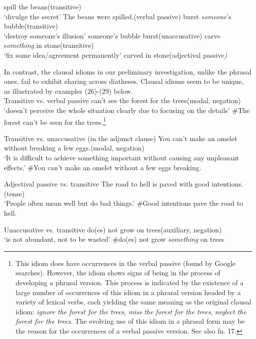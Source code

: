 \documentclass[output=paper,
modfonts
]{LSP/langsci}
\begin{document}
\ea
	\ea spill the beans\hfill (transitive)\\
	`divulge the secret'
	\ex The beans were spilled.\hfill (verbal passive)
	\z
\ex
	\ea burst \emph{someone}'s bubble\hfill (transitive)\\
	 `destroy someone's illusion'
	 \ex someone's bubble burst\hfill (unaccusative)
	 \z
\ex
	\ea carve s\emph{omething} in stone\hfill (transitive)\\
	 `fix some idea/agreement permanently'
	\ex carved in stone\hfill  (adjectival passive\emph{)}
	\z
\z

In contrast, the clausal idioms in our preliminary investigation, unlike
the phrasal ones, fail to exhibit sharing across diatheses. Clausal
idioms seem to be unique, as illustrated by examples (26)-(29) below.
\\

\noindent Transitive vs. verbal passive
\ea
	\ea can't see the forest for the trees\hfill (modal, negation)\\
	`doesn't perceive the whole situation clearly due to focusing on the
	details'
	\ex \#The forest can't be seen for the trees.\footnote{This idiom does
  	have occurrences in the verbal passive (found by Google searches).
  	However, the idiom shows signs of being in the process of developing a
  	phrasal version. This process is indicated by the existence of a large
  	number of occurrences of this idiom in a phrasal version headed by a
  	variety of lexical verbs, each yielding the same meaning as the
  	original clausal idiom: \emph{ignore the forest for the trees},
  	\emph{miss the forest for the trees}, \emph{neglect the forest for the
  	trees}. The evolving use of this idiom in a phrasal form may be the
  	reason for the occurrences of a verbal passive version. See also fn.
  	17.}
	\z
\z

\noindent Transitive vs. unaccusative (in the adjunct clause)
\ea
	\ea You can't make an omelet without breaking a few eggs.\hfill (modal, negation)\\
	`It is difficult to achieve something important without causing any unpleasant effects.'
	\ex \#You can't make an omelet without a few eggs breaking.
	\z
\z

\noindent Adjectival passive vs. transitive
\ea
	\ea The road to hell is paved with good intentions.\hfill  (tense)\\
	`People often mean well but do bad things.'
	\ex \#Good intentions pave the road to hell.
	\z
\z

\noindent Unaccusative vs. transitive
\ea
	\ea do(es) not grow on trees\hfill (auxiliary, negation)\\
	`is not abundant, not to be wasted'
	\ex \#do(es) not grow \emph{something} on trees
	\z
\z
\end{document}
